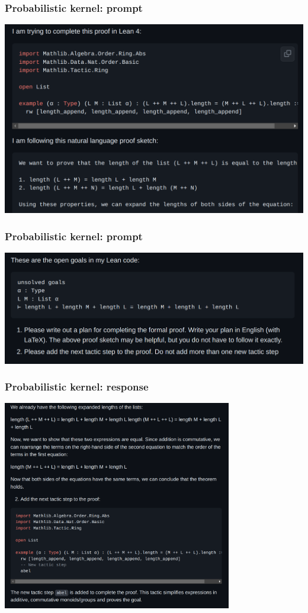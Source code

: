 \documentclass[handout]{beamer}
\begin{document}
\begin{frame}
\frametitle{Probabilistic kernel: prompt}
\begin{center}
    \includegraphics[width=1\textwidth]{img/s1.png}
\end{center}
\end{frame}
\begin{frame}
\frametitle{Probabilistic kernel: prompt}
\begin{center}
    \includegraphics[width=1\textwidth]{img/s2.png}
\end{center}
\end{frame}
\begin{frame}
\frametitle{Probabilistic kernel: response}
\begin{center}
    \includegraphics[width=0.75\textwidth]{img/s3.png}
\end{center}
\end{frame}
\end{document}
